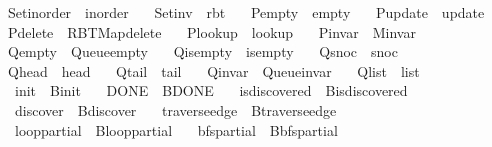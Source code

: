 \begin{isabellebody}
\ \ Set{\isacharunderscore}{\kern0pt}inorder\ {\isacharequal}{\kern0pt}\ inorder\ \isanewline
\ \ Set{\isacharunderscore}{\kern0pt}inv\ {\isacharequal}{\kern0pt}\ rbt\ \isanewline
\ \ P{\isacharunderscore}{\kern0pt}empty\ {\isacharequal}{\kern0pt}\ empty\ \isanewline
\ \ P{\isacharunderscore}{\kern0pt}update\ {\isacharequal}{\kern0pt}\ update\ \isanewline
\ \ P{\isacharunderscore}{\kern0pt}delete\ {\isacharequal}{\kern0pt}\ RBT{\isacharunderscore}{\kern0pt}Map{\isachardot}{\kern0pt}delete\ \isanewline
\ \ P{\isacharunderscore}{\kern0pt}lookup\ {\isacharequal}{\kern0pt}\ lookup\ \isanewline
\ \ P{\isacharunderscore}{\kern0pt}invar\ {\isacharequal}{\kern0pt}\ M{\isachardot}{\kern0pt}invar\ \isanewline
\ \ Q{\isacharunderscore}{\kern0pt}empty\ {\isacharequal}{\kern0pt}\ Queue{\isachardot}{\kern0pt}empty\ \isanewline
\ \ Q{\isacharunderscore}{\kern0pt}is{\isacharunderscore}{\kern0pt}empty\ {\isacharequal}{\kern0pt}\ is{\isacharunderscore}{\kern0pt}empty\ \isanewline
\ \ Q{\isacharunderscore}{\kern0pt}snoc\ {\isacharequal}{\kern0pt}\ snoc\ \isanewline
\ \ Q{\isacharunderscore}{\kern0pt}head\ {\isacharequal}{\kern0pt}\ head\ \isanewline
\ \ Q{\isacharunderscore}{\kern0pt}tail\ {\isacharequal}{\kern0pt}\ tail\ \isanewline
\ \ Q{\isacharunderscore}{\kern0pt}invar\ {\isacharequal}{\kern0pt}\ Queue{\isachardot}{\kern0pt}invar\ \isanewline
\ \ Q{\isacharunderscore}{\kern0pt}list\ {\isacharequal}{\kern0pt}\ list\isanewline
\ \ \ init\ {\isacharequal}{\kern0pt}\ B{\isachardot}{\kern0pt}init\isanewline
\ \ \ DONE\ {\isacharequal}{\kern0pt}\ B{\isachardot}{\kern0pt}DONE\isanewline
\ \ \ is{\isacharunderscore}{\kern0pt}discovered\ {\isacharequal}{\kern0pt}\ B{\isachardot}{\kern0pt}is{\isacharunderscore}{\kern0pt}discovered\isanewline
\ \ \ discover\ {\isacharequal}{\kern0pt}\ B{\isachardot}{\kern0pt}discover\isanewline
\ \ \ traverse{\isacharunderscore}{\kern0pt}edge\ {\isacharequal}{\kern0pt}\ B{\isachardot}{\kern0pt}traverse{\isacharunderscore}{\kern0pt}edge\isanewline
\ \ \ loop{\isacharunderscore}{\kern0pt}partial\ {\isacharequal}{\kern0pt}\ B{\isachardot}{\kern0pt}loop{\isacharunderscore}{\kern0pt}partial\isanewline
\ \ \ bfs{\isacharunderscore}{\kern0pt}partial\ {\isacharequal}{\kern0pt}\ B{\isachardot}{\kern0pt}bfs{\isacharunderscore}{\kern0pt}partial\isanewline

\end{isabellebody}
